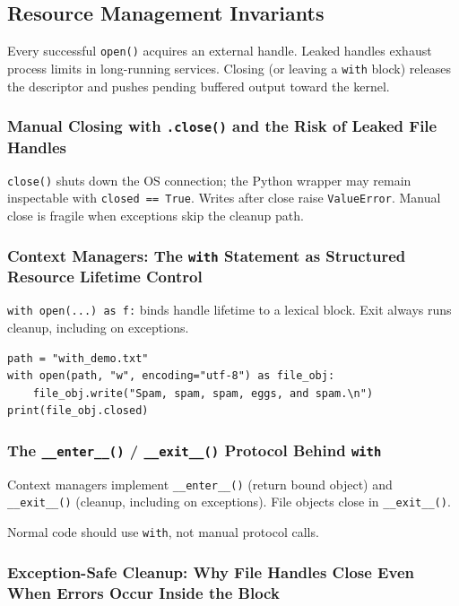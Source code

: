 \subsection{Resource Management Invariants}

Every successful \texttt{open()} acquires an external handle. Leaked handles exhaust process limits in long-running services. Closing (or leaving a \texttt{with} block) releases the descriptor and pushes pending buffered output toward the kernel.

\subsubsection{Manual Closing with \texttt{.close()} and the Risk of Leaked File Handles}

\texttt{close()} shuts down the OS connection; the Python wrapper may remain inspectable with \texttt{closed == True}. Writes after close raise \texttt{ValueError}. Manual close is fragile when exceptions skip the cleanup path.

\subsubsection{Context Managers: The \texttt{with} Statement as Structured Resource Lifetime Control}

\texttt{with open(...) as f:} binds handle lifetime to a lexical block. Exit always runs cleanup, including on exceptions.

\begin{verbatim}
path = "with_demo.txt"
with open(path, "w", encoding="utf-8") as file_obj:
    file_obj.write("Spam, spam, spam, eggs, and spam.\n")
print(file_obj.closed)
\end{verbatim}

\subsubsection{The \texttt{\_\_enter\_\_()} / \texttt{\_\_exit\_\_()} Protocol Behind \texttt{with}}

Context managers implement \texttt{\_\_enter\_\_()} (return bound object) and \texttt{\_\_exit\_\_()} (cleanup, including on exceptions). File objects close in \texttt{\_\_exit\_\_()}.

Normal code should use \texttt{with}, not manual protocol calls.

\subsubsection{Exception-Safe Cleanup: Why File Handles Close Even When Errors Occur Inside the Block}

